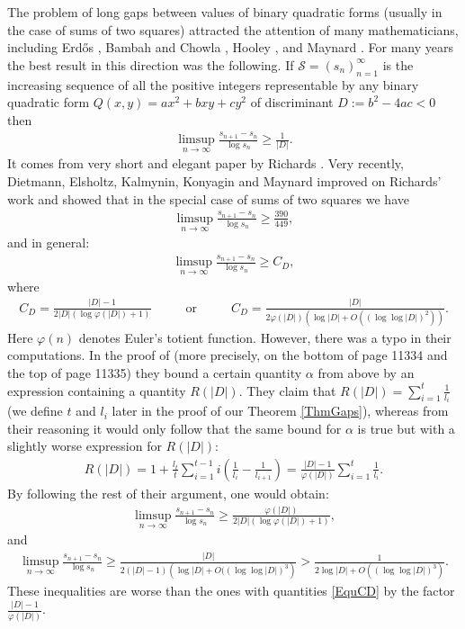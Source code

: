 \documentclass[a4paper]{amsart}
\newcommand{\1}{\mathbbm{1}}
\begin{document}
The problem of long gaps between values of binary quadratic forms (usually in the case of sums of two squares) attracted the attention of many mathematicians, including Erd\H{o}s \cite{Erd}, Bambah and Chowla \cite{BC}, Hooley \cite{Hoo}, and Maynard \cite{May}. For many years the best result in this direction was the following. If $\mathcal{S}=(s_{n})_{n=1}^{\infty}$ is the increasing sequence of all the positive integers representable by any binary quadratic form $Q(x,y)=ax^{2}+bxy+cy^{2}$ of discriminant $D:=b^{2}-4ac<0$ then
\begin{align*}
\limsup_{n\to\infty} \frac{s_{n+1}-s_{n}}{\log s_{n}}\geq \frac{1}{|D|}.
\end{align*}
It comes from very short and elegant paper by Richards \cite{Richards}. Very recently, Dietmann, Elsholtz, Kalmynin, Konyagin and Maynard \cite[Theorem 2]{DEKKM} improved on Richards' work and showed that in the special case of sums of two squares we have
\begin{align*}
\limsup_{n\to\infty} \frac{s_{n+1}-s_{n}}{\log s_{n}}\geq \frac{390}{449},
\end{align*}
and in general:
\begin{align*}
\limsup_{n\to\infty} \frac{s_{n+1}-s_{n}}{\log s_{n}}\geq C_{D},
\end{align*}
where
\begin{align}\label{EquCD}
C_{D}=\frac{|D|-1}{2|D| \left(\log\varphi (|D|) +1\right)} \hspace{1cm} \textrm{ or } \hspace{1cm} C_{D}=\frac{|D|}{2\varphi(|D|)\left(\log |D| + O((\log\log |D|)^{2})\right)}.
\end{align}
Here $\varphi(n)$ denotes Euler's totient function. However, there was a typo in their computations. In the proof of \cite[Theorem 2]{DEKKM} (more precisely, on the bottom of page 11334 and the top of page 11335) they bound a certain quantity $\alpha$ from above by an expression containing a quantity $R(|D|)$. They claim that $R(|D|)=\sum_{i=1}^{t}\frac{1}{l_{i}}$ (we define $t$ and $l_{i}$ later in the proof of our Theorem \ref{ThmGaps}), whereas from their reasoning it would only follow that the same bound for $\alpha$ is true but with a slightly worse expression for $R(|D|)$:
\begin{align*}
R(|D|)=1+\frac{l_{t}}{t}\sum_{i=1}^{t-1}i\left(\frac{1}{l_{i}}-\frac{1}{l_{i+1}}\right) = \frac{|D|-1}{\varphi (|D|)}\sum_{i=1}^{t}\frac{1}{l_{i}}.
\end{align*}
By following the rest of their argument, one would obtain:
\begin{align}\label{DEKKM1}
\limsup_{n\to\infty} \frac{s_{n+1}-s_{n}}{\log s_{n}}\geq \frac{\varphi(|D|)}{2|D| \left(\log\varphi (|D|) +1\right)},
\end{align}
and 
\begin{align}\label{DEKKM2}
\limsup_{n\to\infty} \frac{s_{n+1}-s_{n}}{\log s_{n}}\geq \frac{|D|}{2(|D|-1)\left(\log |D| + O((\log\log |D|)^{3}\right)} > \frac{1}{2\log |D| + O((\log\log |D|)^{3})}.
\end{align}
These inequalities are worse than the ones with quantities \eqref{EquCD} by the factor $\frac{|D|-1}{\varphi (|D|)}$.
\end{document}
